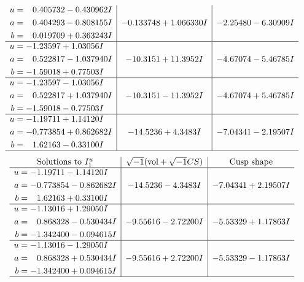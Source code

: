 \documentclass[1p]{elsarticle_modified}
\theoremstyle{definition}
\newcommand{\I}{\sqrt{-1}}
\begin{document}
$$\begin{array}{c|c|c}
\begin{aligned}
u &= \phantom{-}0.405732 - 0.430962 I \\
a &= \phantom{-}0.404293 - 0.808155 I \\
b &= \phantom{-}0.019709 + 0.363243 I\end{aligned}
 & -0.133748 + 1.066330 I & -2.25480 - 6.30909 I \\ \hline\begin{aligned}
u &= -1.23597 + 1.03056 I \\
a &= \phantom{-}0.522817 - 1.037940 I \\
b &= -1.59018 + 0.77503 I\end{aligned}
 & -10.3151 + 11.3952 I & -4.67074 - 5.46785 I \\ \hline\begin{aligned}
u &= -1.23597 - 1.03056 I \\
a &= \phantom{-}0.522817 + 1.037940 I \\
b &= -1.59018 - 0.77503 I\end{aligned}
 & -10.3151 - 11.3952 I & -4.67074 + 5.46785 I \\ \hline\begin{aligned}
u &= -1.19711 + 1.14120 I \\
a &= -0.773854 + 0.862682 I \\
b &= \phantom{-}1.62163 - 0.33100 I\end{aligned}
 & -14.5236 + 4.3483 I & -7.04341 - 2.19507 I\\
 \hline 
 \end{array}$$\newpage$$\begin{array}{c|c|c}  
\text{Solutions to }I^u_{1}& \I (\text{vol} + \sqrt{-1}CS) & \text{Cusp shape}\\
 \hline 
\begin{aligned}
u &= -1.19711 - 1.14120 I \\
a &= -0.773854 - 0.862682 I \\
b &= \phantom{-}1.62163 + 0.33100 I\end{aligned}
 & -14.5236 - 4.3483 I & -7.04341 + 2.19507 I \\ \hline\begin{aligned}
u &= -1.13016 + 1.29050 I \\
a &= \phantom{-}0.868328 - 0.530434 I \\
b &= -1.342400 - 0.094615 I\end{aligned}
 & -9.55616 - 2.72200 I & -5.53329 + 1.17863 I \\ \hline\begin{aligned}
u &= -1.13016 - 1.29050 I \\
a &= \phantom{-}0.868328 + 0.530434 I \\
b &= -1.342400 + 0.094615 I\end{aligned}
 & -9.55616 + 2.72200 I & -5.53329 - 1.17863 I\\
 \hline 
 \end{array}$$\newpage\newpage\renewcommand{\arraystretch}{1}
\end{document}
